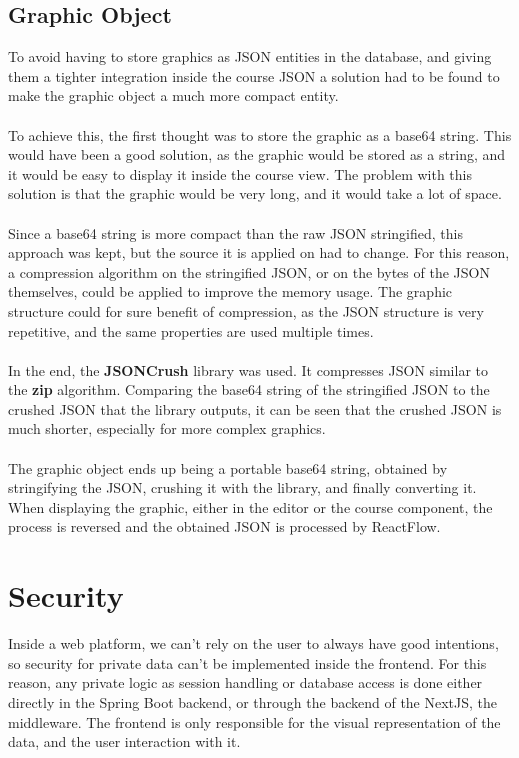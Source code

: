 \subsection{Graphic Object}

\noindent To avoid having to store graphics as JSON entities in the database, and giving them a tighter integration inside the course JSON a solution had to be found to make the graphic object a much more compact entity.
\\\\
\noindent To achieve this, the first thought was to store the graphic as a base64 string. This would have been a good solution, as the graphic would be stored as a string, and it would be easy to display it inside the course view. The problem with this solution is that the graphic would be very long, and it would take a lot of space.
\\\\
\noindent Since a base64 string is more compact than the raw JSON stringified, this approach was kept, but the source it is applied on had to change. For this reason, a compression algorithm on the stringified JSON, or on the bytes of the JSON themselves, could be applied to improve the memory usage. The graphic structure could for sure benefit of compression, as the JSON structure is very repetitive, and the same properties are used multiple times.
\\\\
\noindent In the end, the \textbf{JSONCrush} library \cite{jsoncrush} was used. It compresses JSON similar to the \textbf{zip} algorithm. Comparing the base64 string of the stringified JSON to the crushed JSON that the library outputs, it can be seen that the crushed JSON is much shorter, especially for more complex graphics.
\\\\
\noindent The graphic object ends up being a portable base64 string, obtained by stringifying the JSON, crushing it with the library, and finally converting it. When displaying the graphic, either in the editor or the course component, the process is reversed and the obtained JSON is processed by ReactFlow.

\section{Security}

Inside a web platform, we can't rely on the user to always have good intentions, so security for private data can't be implemented inside the frontend. For this reason, any private logic as session handling or database access is done either directly in the Spring Boot backend, or through the backend of the NextJS, the middleware. The frontend is only responsible for the visual representation of the data, and the user interaction with it.

